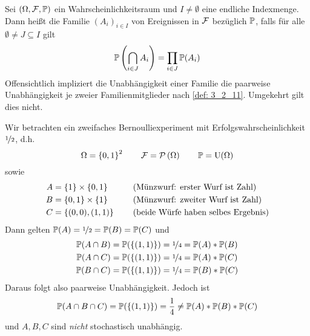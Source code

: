 \begin{definition}
	Sei $(\Omega, \F, \P)$ ein Wahrscheinlichkeitsraum und $I \neq \emptyset$ eine endliche Indexmenge. Dann heißt die Familie $(A_i)_{i \in I}$ von Ereignissen in $\F$  bezüglich $\P$, falls für alle $\emptyset \neq J \subseteq I$ gilt
	\begin{equation*}
		\P\brackets{\bigcap_{i \in J} A_i} = \prod_{i \in J} \P(A_i)
	\end{equation*}
	Offensichtlich impliziert die Unabhängigkeit einer Familie die paarweise Unabhängigkeit je zweier Familienmitglieder nach \cref{def: 3_2_11}. Umgekehrt gilt dies nicht.
\end{definition}

\begin{beispiel}
	Wir betrachten ein zweifaches Bernoulliexperiment mit Erfolgswahrscheinlichkeit $\lfrac{1}{2}$, d.h.
	\begin{equation*}
		\Omega = \menge{0,1}^2 \qquad \F = \pows\Omega \qquad \P = \Uni(\Omega)
	\end{equation*}
	sowie
	\begin{equation*}
	\begin{aligned}
		A &= \menge{1} \times \menge{0,1} \qquad &&\text{(Münzwurf: erster Wurf ist Zahl)}\\
		B &= \menge{0,1} \times \menge{1} &&\text{(Münzwurf: zweiter Wurf ist Zahl)}\\
		C &= \menge{(0,0), (1,1)} &&\text{(beide Würfe haben selbes Ergebnis)}
	\end{aligned}
	\end{equation*}
	Dann gelten $\P(A) = \lfrac{1}{2} = \P(B) = \P(C)$ und
	\begin{equation*}
	\begin{aligned}
		\P(A\cap B) &= \P(\menge{(1,1)}) = \lfrac{1}{4} = \P(A) * \P(B)\\
		\P(A\cap C) &= \P(\menge{(1,1)}) = \lfrac{1}{4} = \P(A) * \P(C)\\
		\P(B\cap C) &= \P(\menge{(1,1)}) = \lfrac{1}{4} = \P(B) * \P(C)
	\end{aligned}
	\end{equation*}
	Daraus folgt also paarweise Unabhängigkeit. Jedoch ist
	\begin{equation*}
		\P(A \cap B \cap C) = \P(\menge{(1,1)}) = \frac{1}{4} \neq \P(A) * \P(B) * \P(C)
	\end{equation*}
	und $A,B,C$ sind \textit{nicht} stochastisch unabhängig.
\end{beispiel}

